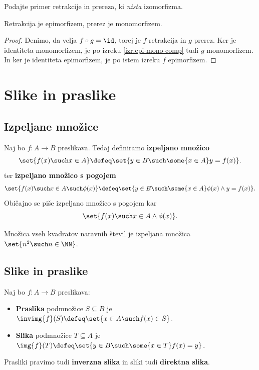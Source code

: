 \begin{vaja}
  Podajte primer retrakcije in prereza, ki \emph{nista} izomorfizma.
\end{vaja}

\begin{izrek}
  Retrakcija je epimorfizem, prerez je monomorfizem.
\end{izrek}

\begin{proof}
  Denimo, da velja $f \circ g = \id$, torej je $f$ retrakcija in $g$ prerez. Ker je identiteta monomorfizem, je po izreku \ref{izr:epi-mono-comp} tudi $g$ monomorfizem. In ker je identiteta epimorfizem, je po istem izreku $f$ epimorfizem.
\end{proof}

\section{Slike in praslike}

\subsection{Izpeljane množice}

Naj bo $f : A \to B$ preslikava. Tedaj definiramo \textbf{izpeljano množico}
%
\begin{equation*}
  \set{ f(x) \such x \in A }
  \defeq \set{ y \in B \such \some{x \in A} y = f(x) }.
\end{equation*}
%
ter \textbf{izpeljano množico s pogojem}
%
\begin{equation*}
  \set{ f(x) \such x \in A \such \phi(x) }
  \defeq \set{ y \in B \such \some{x \in A} \phi(x) \land y = f(x) }.
\end{equation*}
%
Običajno se piše izpeljano množico s pogojem kar
%
\begin{equation*}
  \set{ f(x) \such x \in A \land \phi(x) }.
\end{equation*}

\begin{zgled}
  Množica vseh kvadratov naravnih števil je izpeljana množica $\set{ n^2 \such n \in \NN }$.
\end{zgled}


\subsection{Slike in praslike}

\begin{definicija}
  Naj bo $f : A \to B$ preslikava:
  \begin{itemize}
  \item \textbf{Praslika} podmnožice $S \subseteq B$ je $\invimg{f}(S) \defeq \set{ x \in A \such f(x) \in S }$.
  \item \textbf{Slika} podmnožice $T \subseteq A$ je $\img{f}(T) \defeq \set{ y \in B \such \some{x \in T} f(x) = y }$.
  \end{itemize}
\end{definicija}
%
Prasliki pravimo tudi \textbf{inverzna slika} in sliki tudi \textbf{direktna slika}.

